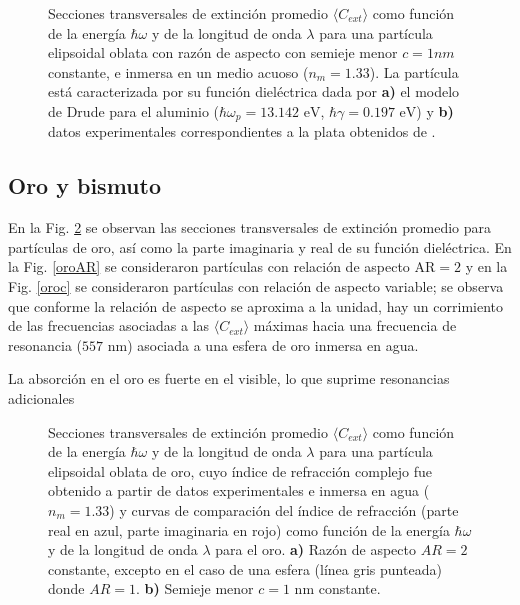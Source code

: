 \begin{figure}[h!]
	\quad%
	\caption{Secciones transversales de extinción promedio $\langle C_{ext}\rangle$ como función de la energía $\hbar\omega$ y de la longitud de onda $\lambda$ para una partícula elipsoidal oblata con razón de aspecto con semieje menor $c=1nm$ constante, e inmersa en un medio acuoso ($n_m=1.33$). La partícula está caracterizada por su función dieléctrica dada por  \textbf{a)} el modelo de Drude para el aluminio ($\hbar\omega_p=13.142\text{ eV}$, $\hbar\gamma=0.197\text{ eV}$) y \textbf{b)} datos experimentales correspondientes a la plata obtenidos de \cite{Plata}.}\label{aluminioplatac}
\end{figure}

\subsection*{Oro y bismuto}
En la Fig. \ref{oro} se observan las secciones transversales de extinción promedio para partículas de oro, así como la parte imaginaria y real de su función dieléctrica. En la Fig. \ref{oroAR} se consideraron partículas con relación de aspecto AR$=2$ y en la Fig. \ref{oroc} se consideraron partículas con relación de aspecto variable; se observa que conforme la relación de aspecto se aproxima a la unidad, hay un corrimiento de las frecuencias asociadas a las $\langle C_{ext}\rangle$ máximas hacia una frecuencia de resonancia ($557\text{ nm}$) asociada a una esfera de oro inmersa en agua. 


La absorción en el oro es fuerte en el visible, lo que suprime resonancias adicionales


\begin{figure}[H]
	\quad%
	\caption{Secciones transversales de extinción promedio $\langle C_{ext}\rangle$ como función de la energía $\hbar\omega$ y de la longitud de onda $\lambda$ para una partícula elipsoidal oblata de oro, cuyo índice de refracción complejo fue obtenido a partir de datos experimentales  e inmersa en agua ($n_m=1.33$) y curvas de comparación del índice de refracción (parte real en azul, parte imaginaria en rojo) como función de la energía $\hbar\omega$ y de la longitud de onda $\lambda$ para el oro. \textbf{a)} Razón de aspecto $AR=2$ constante, excepto en el caso de una esfera (línea gris punteada) donde $AR=1$. \textbf{b)} Semieje menor $c=1$ nm constante.}\label{oro}
\end{figure}


